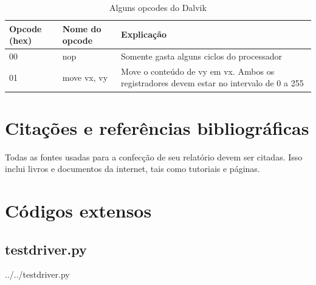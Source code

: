 \documentclass[12pt,a4paper,twoside]{report}
\begin{document}
\begin{table}[h]
  \centering
  \caption{Alguns opcodes do Dalvik \label{tab:opcode2}}
  \begin{tabular}{p{1.5cm}lp{9cm}} \hline
  {\bf Opcode (hex)} & {\bf Nome do opcode} & {\bf Explicação} \\ \hline
  00 & nop & Somente gasta alguns ciclos do processador \\ \hline
  01 & move vx, vy & Move o conteúdo de vy em vx. Ambos os registradores
   devem estar no intervalo de 0 a 255 \\\hline
  \end{tabular}
\end{table}

\chapter{Citações e referências bibliográficas}
Todas as fontes usadas para a confecção de seu relatório devem ser citadas. Isso
inclui livros e documentos da internet, tais como tutoriais e páginas.

\clearpage
{}
\appendix

\chapter{Códigos extensos \label{ap:testdriver}}
\section{testdriver.py}
 {../../testdriver.py}
\end{document}
